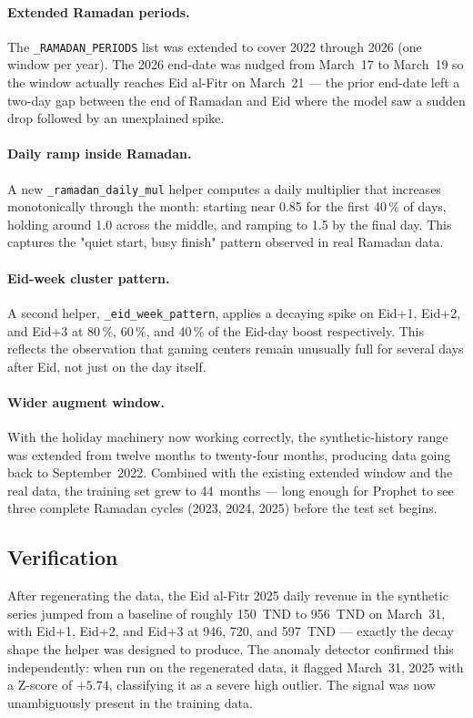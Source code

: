 \paragraph{Extended Ramadan periods.} The \texttt{\_RAMADAN\_PERIODS} list was
extended to cover 2022 through 2026 (one window per year). The 2026 end-date
was nudged from March~17 to March~19 so the window actually reaches Eid
al-Fitr on March~21 --- the prior end-date left a two-day gap between the end
of Ramadan and Eid where the model saw a sudden drop followed by an unexplained
spike.

\paragraph{Daily ramp inside Ramadan.} A new \texttt{\_ramadan\_daily\_mul}
helper computes a daily multiplier that increases monotonically through the
month: starting near 0.85 for the first 40\,\% of days, holding around 1.0
across the middle, and ramping to 1.5 by the final day. This captures the
"quiet start, busy finish" pattern observed in real Ramadan data.

\paragraph{Eid-week cluster pattern.} A second helper,
\texttt{\_eid\_week\_pattern}, applies a decaying spike on Eid+1, Eid+2, and
Eid+3 at 80\,\%, 60\,\%, and 40\,\% of the Eid-day boost respectively. This
reflects the observation that gaming centers remain unusually full for several
days after Eid, not just on the day itself.

\paragraph{Wider augment window.} With the holiday machinery now working
correctly, the synthetic-history range was extended from twelve months to
twenty-four months, producing data going back to September~2022. Combined
with the existing extended window and the real data, the training set grew
to 44~months --- long enough for Prophet to see three complete Ramadan cycles
(2023, 2024, 2025) before the test set begins.

\subsection{Verification}

After regenerating the data, the Eid al-Fitr 2025 daily revenue in the
synthetic series jumped from a baseline of roughly 150~TND to 956~TND on
March~31, with Eid+1, Eid+2, and Eid+3 at 946, 720, and 597~TND --- exactly
the decay shape the helper was designed to produce. The anomaly detector
confirmed this independently: when run on the regenerated data, it flagged
March~31, 2025 with a Z-score of $+5.74$, classifying it as a severe high
outlier. The signal was now unambiguously present in the training data.

